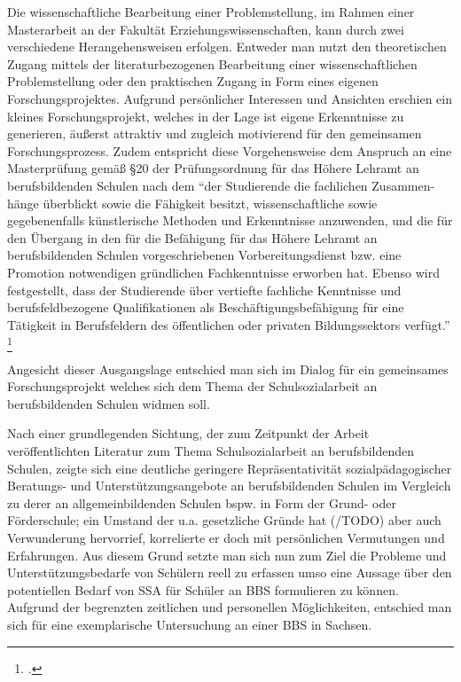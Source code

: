 Die wissenschaftliche Bearbeitung einer Problemstellung, im Rahmen einer Masterarbeit an der Fakultät Erziehungswissenschaften, kann durch zwei verschiedene Herangehensweisen erfolgen. Entweder man nutzt den theoretischen Zugang mittels der literaturbezogenen Bearbeitung einer wissenschaftlichen Problemstellung oder den praktischen Zugang in Form eines eigenen Forschungsprojektes.
Aufgrund persönlicher Interessen und Ansichten erschien ein kleines Forschungsprojekt, welches in der Lage ist eigene Erkenntnisse zu generieren, äußerst attraktiv und zugleich motivierend für den gemeinsamen Forschungsprozess. Zudem entspricht diese Vorgehensweise dem Anspruch an eine Masterprüfung gemäß §20 der Prüfungsordnung für das Höhere Lehramt an berufsbildenden Schulen nach dem "`der Studierende die fachlichen Zusammen-hänge überblickt sowie die Fähigkeit besitzt, wissenschaftliche sowie gegebenenfalls künstlerische Methoden und Erkenntnisse anzuwenden, und die für den Übergang in den für die Befähigung für das Höhere Lehramt an berufsbildenden Schulen vorgeschriebenen Vorbereitungsdienst bzw. eine Promotion notwendigen gründlichen Fachkenntnisse erworben hat. Ebenso wird festgestellt, dass der Studierende über vertiefte fachliche Kenntnisse und berufsfeldbezogene Qualifikationen als Beschäftigungsbefähigung für eine Tätigkeit in Berufsfeldern des öffentlichen oder privaten Bildungssektors verfügt."' \footcite[13]{TUDresden2010}

Angesicht dieser Ausgangslage entschied man sich im Dialog für ein gemeinsames Forschungsprojekt welches sich dem Thema der Schulsozialarbeit an berufsbildenden Schulen widmen soll. 

Nach einer grundlegenden Sichtung, der zum Zeitpunkt der Arbeit veröffentlichten Literatur zum Thema Schulsozialarbeit an berufsbildenden Schulen, zeigte sich eine deutliche geringere Repräsentativität sozialpädagogischer Beratungs- und Unterstützungsangebote an berufsbildenden Schulen im Vergleich zu derer an allgemeinbildenden Schulen bspw. in Form der Grund- oder Förderschule; ein Umstand der u.a. gesetzliche Gründe hat (/TODO) aber auch Verwunderung hervorrief, korrelierte er doch mit persönlichen Vermutungen und Erfahrungen. Aus diesem Grund setzte man sich nun zum Ziel die Probleme und Unterstützungsbedarfe von Schülern reell zu erfassen umso eine Aussage über den potentiellen Bedarf von SSA für Schüler an BBS formulieren zu können. Aufgrund der begrenzten zeitlichen und personellen Möglichkeiten, entschied man sich für eine exemplarische Untersuchung an einer BBS in Sachsen.
 
